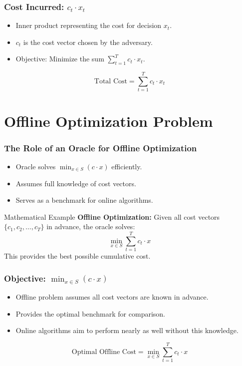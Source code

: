 \documentclass{beamer}
\begin{document}
\begin{frame}
\frametitle{Cost Incurred: \( c_t \cdot x_t \)}
\begin{itemize}
    \item Inner product representing the cost for decision \( x_t \).
    \item \( c_t \) is the cost vector chosen by the adversary.
    \item Objective: Minimize the sum \( \sum_{t=1}^T c_t \cdot x_t \).
\end{itemize}
\begin{equation*}
    \text{Total Cost} = \sum_{t=1}^T c_t \cdot x_t
\end{equation*}
\end{frame}

\section{Offline Optimization Problem}

\begin{frame}
\frametitle{The Role of an Oracle for Offline Optimization}
\begin{itemize}
    \item Oracle solves \( \min_{x \in S} \left( c \cdot x \right) \) efficiently.
    \item Assumes full knowledge of cost vectors.
    \item Serves as a benchmark for online algorithms.
\end{itemize}
\begin{exampleblock}{Mathematical Example}
    \textbf{Offline Optimization:} Given all cost vectors \( \{c_1, c_2, \dots, c_T\} \) in advance, the oracle solves:
    \[
    \min_{x \in S} \sum_{t=1}^T c_t \cdot x
    \]
    This provides the best possible cumulative cost.
\end{exampleblock}
\end{frame}

\begin{frame}
\frametitle{Objective: \( \min_{x \in S} \left( c \cdot x \right) \)}
\begin{itemize}
    \item Offline problem assumes all cost vectors are known in advance.
    \item Provides the optimal benchmark for comparison.
    \item Online algorithms aim to perform nearly as well without this knowledge.
\end{itemize}
\begin{equation*}
    \text{Optimal Offline Cost} = \min_{x \in S} \sum_{t=1}^T c_t \cdot x
\end{equation*}
\end{frame}
\end{document}
